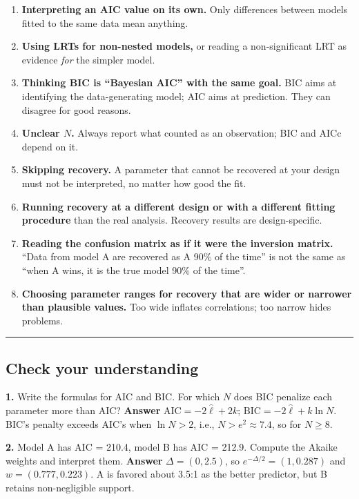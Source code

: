 \begin{enumerate}
\def\labelenumi{\arabic{enumi}.}
\tightlist
\item
  \textbf{Interpreting an AIC value on its own.} Only differences
  between models fitted to the same data mean anything.
\item
  \textbf{Using LRTs for non-nested models,} or reading a
  non-significant LRT as evidence \emph{for} the simpler model.
\item
  \textbf{Thinking BIC is ``Bayesian AIC'' with the same goal.} BIC aims
  at identifying the data-generating model; AIC aims at prediction. They
  can disagree for good reasons.
\item
  \textbf{Unclear \(N\).} Always report what counted as an observation;
  BIC and AICc depend on it.
\item
  \textbf{Skipping recovery.} A parameter that cannot be recovered at
  your design must not be interpreted, no matter how good the fit.
\item
  \textbf{Running recovery at a different design or with a different
  fitting procedure} than the real analysis. Recovery results are
  design-specific.
\item
  \textbf{Reading the confusion matrix as if it were the inversion
  matrix.} ``Data from model A are recovered as A 90\% of the time'' is
  not the same as ``when A wins, it is the true model 90\% of the
  time''.
\item
  \textbf{Choosing parameter ranges for recovery that are wider or
  narrower than plausible values.} Too wide inflates correlations; too
  narrow hides problems.
\end{enumerate}

\begin{center}\rule{0.5\linewidth}{0.5pt}\end{center}

\subsection{Check your understanding}

\textbf{1.} Write the formulas for AIC and BIC. For which \(N\) does BIC
penalize each parameter more than AIC? \textbf{Answer}
\(\mathrm{AIC} = -2\hat\ell + 2k\);
\(\mathrm{BIC} = -2\hat\ell + k\ln N\). BIC's penalty exceeds AIC's when
\(\ln N > 2\), i.e., \(N > e^2 \approx 7.4\), so for \(N \ge 8\).

\textbf{2.} Model A has AIC = 210.4, model B has AIC = 212.9. Compute
the Akaike weights and interpret them. \textbf{Answer}
\(\Delta = (0, 2.5)\), so \(e^{-\Delta/2} = (1, 0.287)\) and
\(w = (0.777, 0.223)\). A is favored about 3.5:1 as the better
predictor, but B retains non-negligible support.

